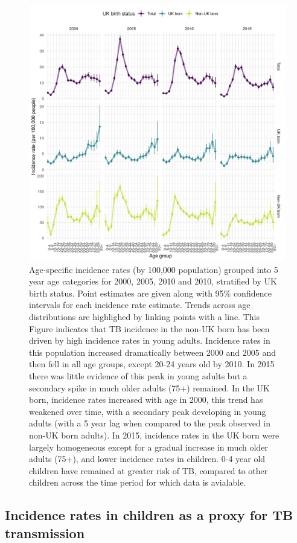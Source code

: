 \documentclass[11pt,twoside]{bristolthesis}
\begin{document}
  \begin{figure}
  
  {\centering \includegraphics[width=0.8\linewidth]{chapters/tb-epi-england/figures/plot-age-dist-inc-rates} 
  
  }
  
  \caption{Age-specific incidence rates (by 100,000 population) grouped into 5 year age categories for 2000, 2005, 2010 and 2010, stratified by UK birth status. Point estimates are given along with 95\% confidence intervals for each incidence rate estimate. Trends across age distributions are highlighed by linking points with a line. This Figure indicates that TB incidence in the non-UK born has been driven by high incidence rates in young adults. Incidence rates in this population increased dramatically between 2000 and 2005 and then fell in all age groups, except 20-24 years old by 2010. In 2015 there was little evidence of this peak in young adults but a secondary spike in much older adults (75+) remained. In the UK born, incidence rates increased with age in 2000, this trend has weakened over time, with a secondary peak developing in young adults (with a 5 year lag when compared to the peak observed in non-UK born adults). In 2015, incidence rates in the UK born were largely homogeneous except for a gradual increase in much older adults (75+), and lower incidence rates in children. 0-4 year old children have remained at greater risk of TB, compared to other children across the time period for which data is avialable.}\label{fig:plot-age-dist-inc-rates}
  \end{figure}
  \hypertarget{incidence-rates-in-children-as-a-proxy-for-tb-transmission}{%
  \subsection{Incidence rates in children as a proxy for TB transmission}\label{incidence-rates-in-children-as-a-proxy-for-tb-transmission}}
  
\end{document}
